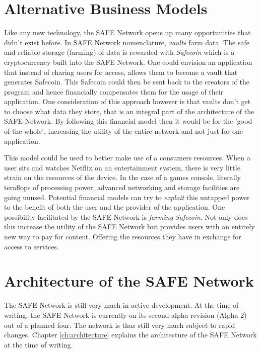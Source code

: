 \section{Alternative Business Models}

Like any new technology, the SAFE Network opens up many opportunities that didn't exist before. In SAFE Network nomenclature, \textit{vaults} farm data. The safe and reliable storage (farming) of data is rewarded with \textit{Safecoin} which is a cryptocurrency built into the SAFE Network. One could envision an application that instead of charing users for access, allows them to become a vault that generates Safecoin. This Safecoin could then be sent back to the creators of the program and hence financially compensates them for the usage of their application. One consideration of this approach however is that vaults don't get to choose what data they store, that is an integral part of the architecture of the SAFE Network. By following this financial model then it would be for the 'good of the whole', increasing the utility of the entire network and not just for one application.

This model could be used to better make use of a consumers resources. When a user sits and watches Netflix on an entertainment system, there is very little strain on the resources of the device. In the case of a games console, literally teraflops of processing power, advanced networking and storage facilities are going unused. Potential financial models can try to \textit{exploit} this untapped power to the benefit of both the user and the provider of the application. One possibility facilitated by the SAFE Network is \textit{farming} \textit{Safecoin}. Not only does this increase the utility of the SAFE Network but provides users with an entirely new way to pay for content. Offering the resources they have in exchange for access to services.

\section{Architecture of the SAFE Network}

The SAFE Network is still very much in active development. At the time of writing, the SAFE Network is currently on its second alpha revision (Alpha 2) out of a planned four. The network is thus still very much subject to rapid changes. Chapter \ref{ch:architecture} explains the architecture of the SAFE Network at the time of writing.